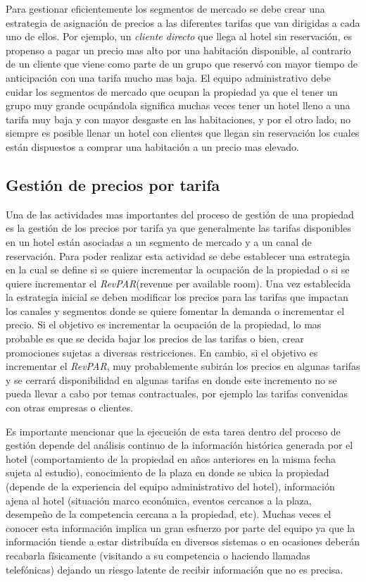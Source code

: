 Para gestionar eficientemente los segmentos de mercado se debe crear una estrategia de asignación de precios a las diferentes tarifas que van dirigidas a cada uno de ellos. Por ejemplo, un \emph{cliente directo} que llega al hotel sin reservación, es propenso a pagar un precio mas alto por una habitación disponible, al contrario de un cliente que viene como parte de un grupo que reservó con mayor tiempo de anticipación con una tarifa mucho mas baja. El equipo administrativ\emph{}o debe cuidar los segmentos de mercado que ocupan la propiedad ya que el tener un grupo muy grande ocupándola significa muchas veces tener un hotel lleno a una tarifa muy baja y con mayor desgaste en las habitaciones, y por el otro lado, no siempre es posible llenar un hotel con clientes que llegan sin reservación los cuales están dispuestos a comprar una habitación a un precio mas elevado.

\subsection*{Gestión de precios por tarifa}

Una de las actividades mas importantes del proceso de gestión de una propiedad es la gestión de los precios por tarifa ya que generalmente las tarifas disponibles en un hotel están asociadas a un segmento de mercado y a un canal de reservación. Para poder realizar esta actividad se debe establecer una estrategia en la cual se define si se quiere incrementar la ocupación de la propiedad o si se quiere incrementar el \emph{RevPAR}(revenue per available room). Una vez establecida la estrategia inicial se deben modificar los precios para las tarifas que impactan los canales y segmentos donde se quiere fomentar la demanda o incrementar el precio. Si el objetivo es incrementar la ocupación de la propiedad, lo mas probable es que se decida bajar los precios de las tarifas o bien, crear promociones sujetas a diversas restricciones. En cambio, si el objetivo es incrementar el \emph{RevPAR}, muy probablemente subirán los precios en algunas tarifas y se cerrará disponibilidad en algunas tarifas en donde este incremento no se pueda llevar a cabo por temas contractuales, por ejemplo las tarifas convenidas con otras empresas o clientes.

Es importante mencionar que la ejecución de esta tarea dentro del proceso de gestión depende del análisis continuo de la información histórica generada por el hotel (comportamiento de la propiedad en años anteriores en la misma fecha sujeta al estudio), conocimiento de la plaza en donde se ubica la propiedad (depende de la experiencia del equipo administrativo del hotel), información ajena al hotel (situación marco económica, eventos cercanos a la plaza, desempeño de la competencia cercana a la propiedad, etc). Muchas veces el conocer esta información implica un gran esfuerzo por parte del equipo ya que la información tiende a estar distribuída en diversos sistemas o en ocasiones deberán recabarla físicamente (visitando a su competencia o haciendo llamadas telefónicas) dejando un riesgo latente de recibir información que no es precisa.

